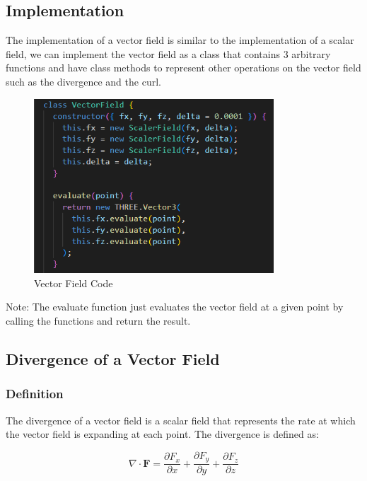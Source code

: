\documentclass[12pt]{article}
\begin{document}
\subsection{Implementation}

The implementation of a vector field is similar to the implementation of a scalar field, we can implement the vector field as a class that contains 3 arbitrary functions and have class methods to represent other operations on the vector field such as the divergence and the curl.

\begin{figure}[H]
    \centering
    \includegraphics[width=0.8\textwidth]{images/vector.png}
    \caption{Vector Field Code\cite{El-Deeb_PEU-218_Stokes_Threejs}}
\end{figure}

Note: The evaluate function just evaluates the vector field at a given point by calling the functions and return the result.

\subsection{Divergence of a Vector Field}

\subsubsection{Definition}

The divergence of a vector field is a scalar field that represents the rate at which the vector field is expanding at each point. The divergence is defined as:

\[
    \nabla \cdot \mathbf{F} = \frac{\partial F_x}{\partial x} + \frac{\partial F_y}{\partial y} + \frac{\partial F_z}{\partial z}
\]
\end{document}
